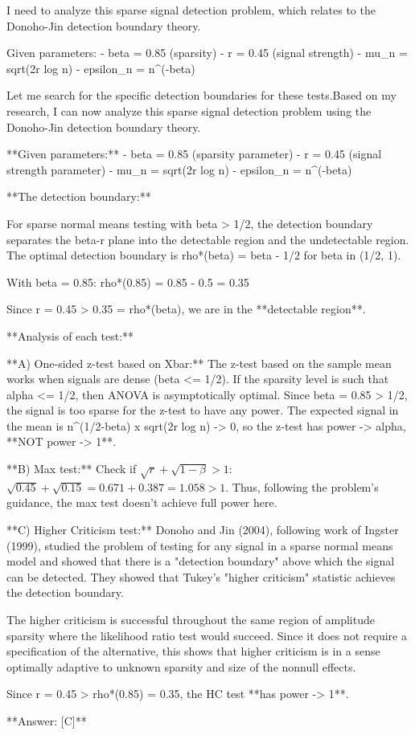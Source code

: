 I need to analyze this sparse signal detection problem, which relates to the Donoho-Jin detection boundary theory.

Given parameters:
- beta = 0.85 (sparsity)
- r = 0.45 (signal strength)
- mu_n = sqrt(2r log n)
- epsilon_n = n^(-beta)

Let me search for the specific detection boundaries for these tests.Based on my research, I can now analyze this sparse signal detection problem using the Donoho-Jin detection boundary theory.

**Given parameters:**
- beta = 0.85 (sparsity parameter)
- r = 0.45 (signal strength parameter)  
- mu_n = sqrt(2r log n)
- epsilon_n = n^(-beta)

**The detection boundary:**

For sparse normal means testing with beta > 1/2, the detection boundary separates the beta-r plane into the detectable region and the undetectable region. The optimal detection boundary is rho*(beta) = beta - 1/2 for beta in (1/2, 1).

With beta = 0.85: rho*(0.85) = 0.85 - 0.5 = 0.35

Since r = 0.45 > 0.35 = rho*(beta), we are in the **detectable region**.

**Analysis of each test:**

**A) One-sided z-test based on Xbar:**
The z-test based on the sample mean works when signals are dense (beta <= 1/2). If the sparsity level is such that alpha <= 1/2, then ANOVA is asymptotically optimal. Since beta = 0.85 > 1/2, the signal is too sparse for the z-test to have any power. The expected signal in the mean is n^(1/2-beta) x sqrt(2r log n) -> 0, so the z-test has power -> alpha, **NOT power -> 1**.

**B) Max test:** 
Check if $\sqrt{r} + \sqrt{1-\beta} > 1$: $\sqrt{0.45} + \sqrt{0.15} = 0.671 + 0.387 = 1.058 > 1$. Thus, following the problem's guidance, the max test doesn't achieve full power here.

**C) Higher Criticism test:**
Donoho and Jin (2004), following work of Ingster (1999), studied the problem of testing for any signal in a sparse normal means model and showed that there is a "detection boundary" above which the signal can be detected. They showed that Tukey's "higher criticism" statistic achieves the detection boundary.

The higher criticism is successful throughout the same region of amplitude sparsity where the likelihood ratio test would succeed. Since it does not require a specification of the alternative, this shows that higher criticism is in a sense optimally adaptive to unknown sparsity and size of the nonnull effects.

Since r = 0.45 > rho*(0.85) = 0.35, the HC test **has power -> 1**.

**Answer: [C]**
